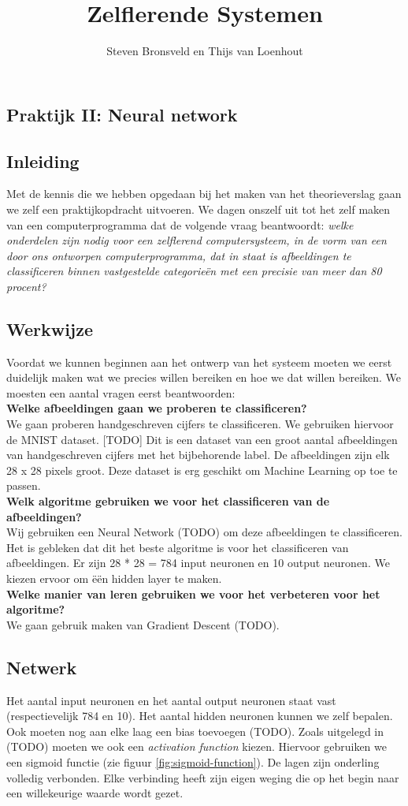 \documentclass[a4paper,titlepage]{article}
\title{Zelflerende Systemen}
\author{Steven Bronsveld en Thijs van Loenhout}
\begin{document}
\textcolor{praktijk}{
	\section{Praktijk II: Neural network}
}


\subsection{Inleiding}
Met de kennis die we hebben opgedaan bij het maken van het theorieverslag gaan we zelf een praktijkopdracht uitvoeren. We dagen onszelf uit tot het zelf maken van een computerprogramma dat de volgende vraag beantwoordt: \textit{welke onderdelen zijn nodig voor een zelflerend computersysteem, in de vorm van een door ons ontworpen computerprogramma, dat in staat is afbeeldingen te classificeren binnen vastgestelde categorie\"en met een precisie van meer dan 80 procent?}

\subsection{Werkwijze}
Voordat we kunnen beginnen aan het ontwerp van het systeem moeten we eerst duidelijk maken wat we precies willen bereiken en hoe we dat willen bereiken. We moesten een aantal vragen eerst beantwoorden:\\
\textbf{Welke afbeeldingen gaan we proberen te classificeren?}\\
We gaan proberen handgeschreven cijfers te classificeren. We gebruiken hiervoor de MNIST dataset. [TODO] Dit is een dataset van een groot aantal afbeeldingen van handgeschreven cijfers met het bijbehorende label. De afbeeldingen zijn elk 28 x 28 pixels groot. Deze dataset is erg geschikt om Machine Learning op toe te passen.\\
\textbf{Welk algoritme gebruiken we voor het classificeren van de afbeeldingen?}\\
Wij gebruiken een Neural Network (TODO) om deze afbeeldingen te classificeren. Het is gebleken dat dit het beste algoritme is voor het classificeren van afbeeldingen. Er zijn 28 * 28 = 784 input neuronen en 10 output neuronen. We kiezen ervoor om \"e\"en hidden layer te maken.\\
\textbf{Welke manier van leren gebruiken we voor het verbeteren voor het algoritme?}\\
We gaan gebruik maken van Gradient Descent (TODO).

\subsection{Netwerk}
Het aantal input neuronen en het aantal output neuronen staat vast (respectievelijk 784 en 10). Het aantal hidden neuronen kunnen we zelf bepalen. Ook moeten nog aan elke laag een bias toevoegen (TODO). Zoals uitgelegd in (TODO) moeten we ook een \textit{activation function} kiezen. Hiervoor gebruiken we een sigmoid functie (zie figuur \ref{fig:sigmoid-function}). De lagen zijn onderling volledig verbonden. Elke verbinding heeft zijn eigen weging die op het begin naar een willekeurige waarde wordt gezet.
\end{document}

